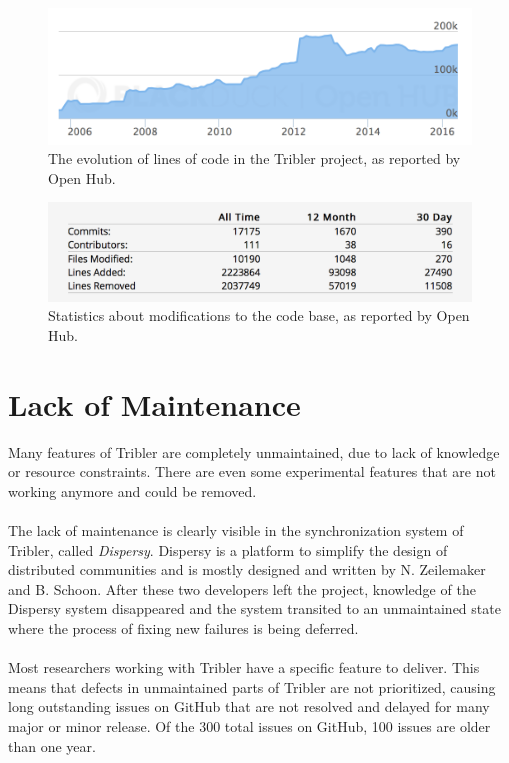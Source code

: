 \begin{figure}[!h]
	\centering
	\includegraphics[width=\columnwidth]{images/openhub_loc}
	\caption{The evolution of lines of code in the Tribler project, as reported by Open Hub.}
	\label{fig:openhub-loc}
\end{figure}

\begin{figure}[!h]
	\centering
	\includegraphics[width=0.7\columnwidth]{images/openhub_commits_table}
	\caption{Statistics about modifications to the code base, as reported by Open Hub.}
	\label{fig:openhub-commit-stats}
\end{figure}

\section{Lack of Maintenance}
Many features of Tribler are completely unmaintained, due to lack of knowledge or resource constraints. There are even some experimental features that are not working anymore and could be removed.\\\\
The lack of maintenance is clearly visible in the synchronization system of Tribler, called \emph{Dispersy}. Dispersy is a platform to simplify the design of distributed communities and is mostly designed and written by
N. Zeilemaker and B. Schoon\cite{zeilemaker2013dispersy}. After these two developers left the project, knowledge of the Dispersy system disappeared and the system transited to an unmaintained state where the process of fixing new failures is being deferred.\\\\
Most researchers working with Tribler have a specific feature to deliver. This means that defects in unmaintained parts of Tribler are not prioritized, causing long outstanding issues on GitHub that are not resolved and delayed for many major or minor release. Of the 300 total issues on GitHub, 100 issues are older than one year.
 
